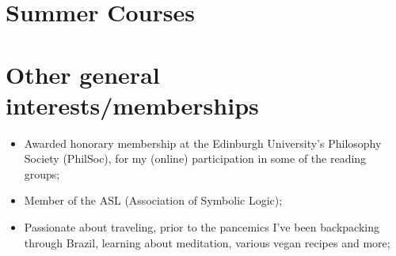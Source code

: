 \documentclass[11pt,a4paper,sans]{moderncv}        %
\begin{document}

\section{Summer Courses}

\section{Other general interests/memberships}
\begin{itemize}
\item Awarded honorary membership at the Edinburgh University's Philosophy Society (PhilSoc), for
  my (online) participation in some of the reading groups;
\item Member of the ASL (Association of Symbolic Logic);
\item Passionate about traveling, prior to the pancemics I've been backpacking
  through Brazil, learning about meditation, various vegan recipes and more;
\end{itemize}





\end{document}
